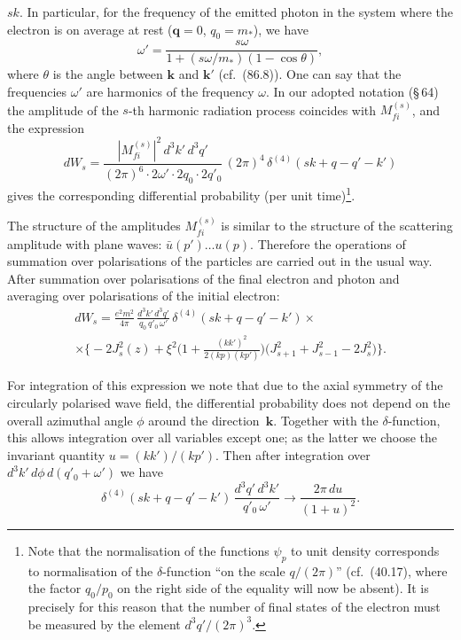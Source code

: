 \noindent $sk$. In particular, for the frequency of the emitted photon in the system where the electron is on average at rest ($\mathbf{q} = 0$, $q_0 = m_*$), we have
\begin{equation}
\omega' = \frac{s\omega}{1 + (s\omega/m_*)(1 - \cos\theta)},
\label{eq:101.12}
\end{equation}
where $\theta$ is the angle between $\mathbf{k}$ and $\mathbf{k}'$ (cf.~(86.8)). One can say that the frequencies $\omega'$ are harmonics of the frequency $\omega$. In our adopted notation (\S\,64) the amplitude of the $s$-th harmonic radiation process coincides with $M_{fi}^{(s)}$, and the expression
\begin{equation}
dW_s = \frac{|M_{fi}^{(s)}|^2\,d^3k'\,d^3q'}{(2\pi)^6\cdot 2\omega'\cdot 2q_0\cdot 2q'_0}\,(2\pi)^4\,\delta^{(4)}(sk + q - q' - k')
\label{eq:101.13}
\end{equation}
gives the corresponding differential probability (per unit time)\footnote{Note that the normalisation of the functions $\psi_p$ to unit density corresponds to normalisation of the $\delta$-function ``on the scale $q/(2\pi)$'' (cf.~(40.17), where the factor $q_0/p_0$ on the right side of the equality will now be absent). It is precisely for this reason that the number of final states of the electron must be measured by the element $d^3q'/(2\pi)^3$.}.

The structure of the amplitudes $M_{fi}^{(s)}$ is similar to the structure of the scattering amplitude with plane waves: $\bar{u}(p')\ldots u(p)$. Therefore the operations of summation over polarisations of the particles are carried out in the usual way. After summation over polarisations of the final electron and photon and averaging over polarisations of the initial electron:
\begin{equation}
\begin{split}
dW_s = \frac{e^2 m^2}{4\pi}\,\frac{d^3k'\,d^3q'}{q_0\,q'_0\,\omega'}\,\delta^{(4)}(sk + q - q' - k') \times {} \\
\times \biggl\{-2J_s^2(z) + \xi^2\biggl(1 + \frac{(kk')^2}{2(kp)(kp')}\biggr)\bigl(J_{s+1}^2 + J_{s-1}^2 - 2J_s^2\bigr)\biggr\}.
\end{split}
\label{eq:101.14}
\end{equation}

For integration of this expression we note that due to the axial symmetry of the circularly polarised wave field, the differential probability does not depend on the overall azimuthal angle $\phi$ around the direction~$\mathbf{k}$. Together with the $\delta$-function, this allows integration over all variables except one; as the latter we choose the invariant quantity $u = (kk')/(kp')$. Then after integration over $d^3k'\,d\phi\,d(q'_0 + \omega')$ we have
\[
\delta^{(4)}(sk + q - q' - k')\,\frac{d^3q'\,d^3k'}{q'_0\,\omega'} \to \frac{2\pi\,du}{(1+u)^2}.
\]

